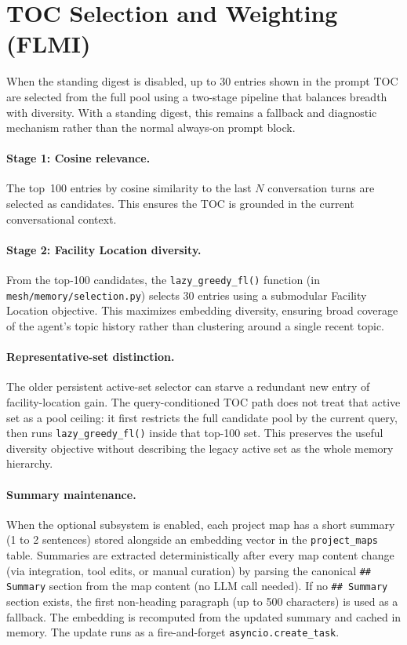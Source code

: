 \documentclass[11pt,letterpaper]{report}
\newcommand{\code}[1]{\texttt{#1}}
\begin{document}
\section{TOC Selection and Weighting (FLMI)}

When the standing digest is disabled, up to 30 entries shown in the prompt
TOC are selected from the full pool using a two-stage pipeline that balances
breadth with diversity. With a standing digest, this remains a fallback and
diagnostic mechanism rather than the normal always-on prompt block.

\paragraph{Stage 1: Cosine relevance.}
The top~100 entries by cosine similarity to the last $N$ conversation
turns are selected as candidates. This ensures the TOC is grounded in
the current conversational context.

\paragraph{Stage 2: Facility Location diversity.}
From the top-100 candidates, the \code{lazy\_greedy\_fl()} function
(in \code{mesh/memory/selection.py}) selects 30 entries using a
submodular Facility Location objective. This maximizes embedding
diversity, ensuring broad coverage of the agent's topic history rather
than clustering around a single recent topic.

\paragraph{Representative-set distinction.}
The older persistent active-set selector can starve a redundant new entry of
facility-location gain. The query-conditioned TOC path does not treat that
active set as a pool ceiling: it first restricts the full candidate pool by
the current query, then runs \code{lazy\_greedy\_fl()} inside that top-100
set. This preserves the useful diversity objective without describing the
legacy active set as the whole memory hierarchy.

\paragraph{Summary maintenance.}
When the optional subsystem is enabled, each project map has a short summary
(1 to 2 sentences) stored alongside
an embedding vector in the \code{project\_maps} table. Summaries are
extracted deterministically after every map content change (via
integration, tool edits, or manual curation) by parsing the canonical
\code{\#\# Summary} section from the map content (no LLM call needed).
If no \code{\#\# Summary} section exists, the first non-heading
paragraph (up to 500 characters) is used as a fallback. The embedding
is recomputed from the updated summary and cached in memory. The update
runs as a fire-and-forget \code{asyncio.create\_task}.
\end{document}
